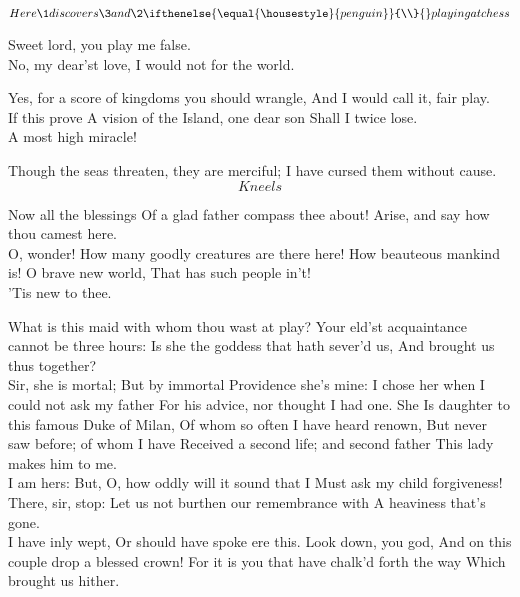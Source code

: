 \documentclass[11pt]{book}
\begin{document}
	\[Here \1 discovers \3 and \2
    \ifthenelse {\equal {\housestyle}{penguin}}{\\}{} 
    playing at chess\]

\2	Sweet lord, you play me false. \\

\3	No, my dear'st love,
	I would not for the world.

\2	Yes, for a score of kingdoms you should wrangle,
	And I would call it, fair play.  \\

\6	If this prove
	A vision of the Island, one dear son
	Shall I twice lose. \\

\8	A most high miracle!

\3	Though the seas threaten, they are merciful;
	I have cursed them without cause. \\
	\[Kneels\]

\6	Now all the blessings
	Of a glad father compass thee about!
	Arise, and say how thou camest here. \\

\2	O, wonder!
	How many goodly creatures are there here!
	How beauteous mankind is! O brave new world,
	That has such people in't! \\

\1	'Tis new to thee.

\6	What is this maid with whom thou wast at play?
	Your eld'st acquaintance cannot be three hours:
	Is she the goddess that hath sever'd us,
	And brought us thus together? \\

\3	Sir, she is mortal;
	But by immortal Providence she's mine:
	I chose her when I could not ask my father
	For his advice, nor thought I had one. She
	Is daughter to this famous Duke of Milan,
	Of whom so often I have heard renown,
	But never saw before; of whom I have
	Received a second life; and second father
	This lady makes him to me. \\

\6	I am hers:
	But, O, how oddly will it sound that I
	Must ask my child forgiveness! \\

\1	There, sir, stop:
	Let us not burthen our remembrance with
	A heaviness that's gone. \\

\9	I have inly wept,
	Or should have spoke ere this. Look down, you god,
	And on this couple drop a blessed crown!
	For it is you that have chalk'd forth the way
	Which brought us hither. \\
\end{document}
